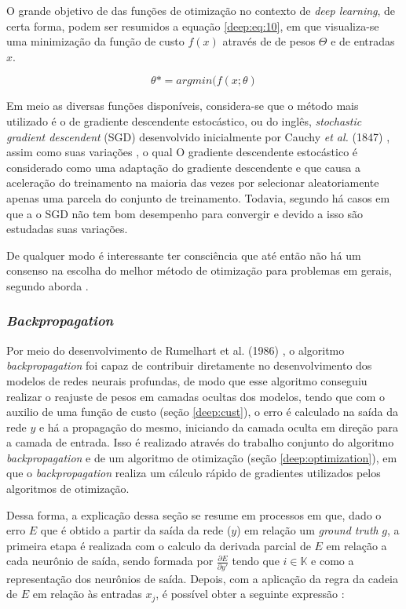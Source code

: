 O grande objetivo de das funções de otimização no contexto de \textit{deep learning}, de certa forma, podem ser resumidos a equação \ref{deep:eq:10}, em que visualiza-se uma minimização da função de custo $f(x)$ através de de pesos $\Theta$ e de entradas $x$.

\begin{equation}
    \label{deep:eq:10}
    \theta* = argmin(f(x;\theta)
\end{equation}

Em meio as diversas funções disponíveis, considera-se que o método mais utilizado é o de gradiente descendente estocástico, ou do inglês, \textit{stochastic gradient descendent} (SGD) desenvolvido inicialmente por Cauchy \textit{et al.} (1847) \cite{cauchy1847methode}, assim como suas variações \cite{Goodfellow2016}, o qual O gradiente descendente estocástico é considerado como uma adaptação do gradiente descendente e que causa a aceleração do treinamento na maioria das vezes por selecionar aleatoriamente apenas uma parcela do conjunto de treinamento. Todavia, segundo \cite{Goodfellow2016} há casos em que a o SGD não tem bom desempenho para convergir e devido a isso são estudadas suas variações.

De qualquer modo é interessante ter consciência que até então não há um consenso na escolha do melhor método de otimização para problemas em gerais, segundo aborda \cite{Goodfellow2016}.

\subsubsection{\textit{Backpropagation}}
\label{deep:backprop}

Por meio do desenvolvimento de Rumelhart et al. (1986) \cite{rumelhart1986learning}, o algoritmo \textit{backpropagation} foi capaz de contribuir diretamente no desenvolvimento dos modelos de redes neurais profundas, de modo que esse algoritmo conseguiu realizar o reajuste de pesos em camadas ocultas dos modelos, tendo que com o auxilio de uma função de custo (seção \ref{deep:cust}), o erro é calculado na saída da rede $y$ e há a propagação do mesmo, iniciando da camada oculta em direção para a camada de entrada. Isso é realizado através do trabalho conjunto do algoritmo \textit{backpropagation} e de um algoritmo de otimização (seção \ref{deep:optimization}), em que o \textit{backpropagation} realiza um cálculo rápido de gradientes utilizados pelos algoritmos de otimização.

Dessa forma, a explicação dessa seção se resume em processos em que, dado o erro $E$ que é obtido a partir da saída da rede ($y$) em relação um \textit{ground truth} $g$, a primeira etapa é realizada com o calculo da derivada parcial de $E$ em relação a cada neurônio de saída, sendo formada por $\frac{\partial E}{\partial y'}$ tendo que $i \in \mathbb{K}$ e  como a representação dos neurônios de saída. Depois, com a aplicação da regra da cadeia de $E$ em relação às entradas $x_j$, é possível obter a seguinte expressão \cite{rumelhart1986learning}:


